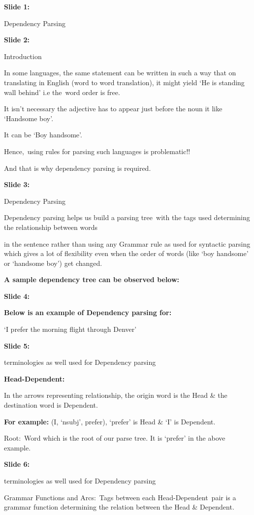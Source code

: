 \documentclass[11pt,a4paper]{article}
\begin{document}
\textbf{Slide 1:}

Dependency Parsing

\textbf{Slide 2:}

Introduction

In some languages, the same statement can be written in such a way that on translating in English (word to word translation), it might yield ‘He is standing wall behind’ i.e the word order is free.

It isn’t necessary the adjective has to appear just before the noun it like ‘Handsome boy’.

It can be ‘Boy handsome’.

Hence, using rules for parsing such languages is problematic!!

And that is why dependency parsing is required.

\textbf{Slide 3:}

Dependency Parsing

Dependency parsing helps us build a parsing tree with the tags used determining the relationship between words

in the sentence rather than using any Grammar rule as used for syntactic parsing which gives a lot of flexibility even when the order of words (like ‘boy handsome’ or ‘handsome boy’) get changed.

\textbf{A sample dependency tree can be observed below:} 

\textbf{Slide 4:}

\textbf{Below is an example of Dependency parsing for:} 

‘I prefer the morning flight through Denver’

\textbf{Slide 5:}

terminologies as well used for Dependency parsing

\textbf{Head-Dependent:} 

In the arrows representing relationship, the origin word is the Head & the destination word is Dependent.

\textbf{For example:}  (I, ‘nsubj’, prefer), ‘prefer’ is Head \& ‘I’ is Dependent.

Root: Word which is the root of our parse tree. It is ‘prefer’ in the above example.

\textbf{Slide 6:}

terminologies as well used for Dependency parsing

Grammar Functions and Arcs: Tags between each Head-Dependent pair is a grammar function determining the relation between the Head & Dependent.
\end{document}
